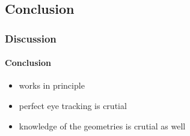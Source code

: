 \documentclass[%
14pt
]{beamer}
\begin{document}
\subsection{Conclusion}
\begin{frame}
	\frametitle{Discussion}
  \framesubtitle{Conclusion}
  \begin{itemize}
    \item works in principle
    \item perfect eye tracking is crutial
    \item knowledge of the geometries is crutial as well
  \end{itemize}
\end{frame}
\end{document}
